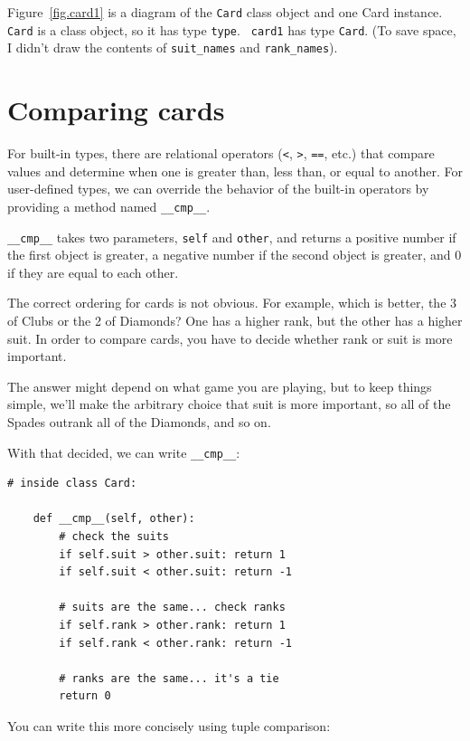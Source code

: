 \documentclass[10pt]{book}
\begin{document}
Figure~\ref{fig.card1} is a diagram of the {\tt Card} class object
and one Card instance.
{\tt Card} is a class object, so it has type {\tt type}.  {\tt
card1} has type {\tt Card}.  (To save space, I didn't draw the
contents of \verb"suit_names" and \verb"rank_names").


\section{Comparing cards}
\label{comparecard}

For built-in types, there are relational operators
({\tt <}, {\tt >}, {\tt ==}, etc.)
that compare
values and determine when one is greater than, less than, or equal to
another.  For user-defined types, we can override the behavior of
the built-in operators by providing a method named
\verb"__cmp__".

\verb"__cmp__" takes two parameters, {\tt self} and {\tt other},
and returns a positive number if the first object is greater, a
negative number if the second object is greater, and 0 if they are
equal to each other.

The correct ordering for cards is not obvious.
For example, which
is better, the 3 of Clubs or the 2 of Diamonds?  One has a higher
rank, but the other has a higher suit.  In order to compare
cards, you have to decide whether rank or suit is more important.

The answer might depend on what game you are playing, but to keep
things simple, we'll make the arbitrary choice that suit is more
important, so all of the Spades outrank all of the Diamonds,
and so on.

With that decided, we can write \verb"__cmp__":

\begin{verbatim}
# inside class Card:

    def __cmp__(self, other):
        # check the suits
        if self.suit > other.suit: return 1
        if self.suit < other.suit: return -1

        # suits are the same... check ranks
        if self.rank > other.rank: return 1
        if self.rank < other.rank: return -1

        # ranks are the same... it's a tie
        return 0
\end{verbatim}
%
You can write this more concisely using tuple comparison:
\end{document}

